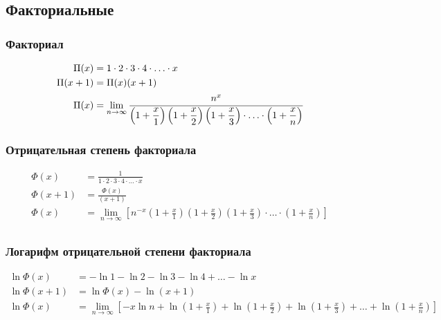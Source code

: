 \subsection{Факториальные}

\subsubsection{Факториал}

\begin{equation*}
\begin{aligned}
\Pi(x) &= 1 \cdot 2 \cdot 3 \cdot 4 \cdot \ldots \cdot x
\\
\Pi(x + 1) &= \Pi(x) (x + 1)
\\
\Pi(x) &= \lim_{n \to \infty}
{
\cfrac{n^x}
{
\left(1 + \displaystyle \frac{x}{1} \right) 
\left(1 + \displaystyle \frac{x}{2} \right)
\left(1 + \displaystyle \frac{x}{3} \right) 
\cdot \ldots \cdot 
\left(1 + \displaystyle \frac{x}{n} \right)
}
} \\
\end{aligned}
\end{equation*}

\subsubsection{Отрицательная степень факториала}

\begin{equation*}
\begin{aligned}
\Phi(x) &= \frac{1}{1 \cdot 2 \cdot 3 \cdot 4 \cdot \ldots \cdot x} \\
\Phi(x + 1) &= \frac{\Phi(x)}{(x + 1)} \\
\Phi(x) &= \lim_{n \to \infty} \left[
n^{-x}
\left(1 + \displaystyle \frac{x}{1} \right) 
\left(1 + \displaystyle \frac{x}{2} \right)
\left(1 + \displaystyle \frac{x}{3} \right) 
\cdot \ldots \cdot 
\left(1 + \displaystyle \frac{x}{n} \right) \right] \\
\end{aligned}
\end{equation*}

\subsubsection{Логарифм отрицательной степени факториала}

\begin{equation*}
\begin{aligned}
\ln{\Phi(x)} &= - \ln{1} - \ln{2} - \ln{3} - \ln{4} + \ldots - \ln{x} \\
\ln{\Phi(x + 1)} &= \ln{\Phi(x)} - \ln{(x + 1)} \\
\ln{\Phi(x)} &= \lim_{n \to \infty}
{\left[
- x \ln{n}
+ \ln{\left(1 + \frac{x}{1} \right)} 
+ \ln{\left(1 + \frac{x}{2} \right)}
+ \ln{\left(1 + \frac{x}{3} \right)}
+ \ldots
+ \ln{\left(1 + \frac{x}{n} \right)}
\right]} \\
\end{aligned}
\end{equation*}

